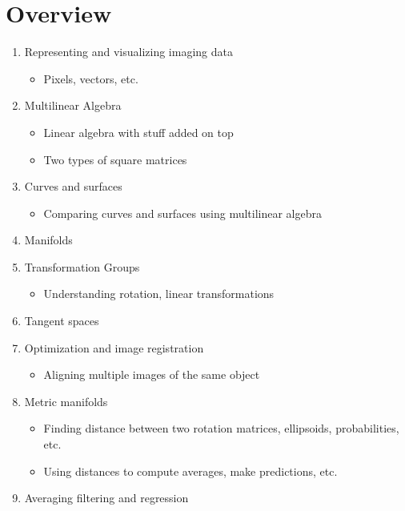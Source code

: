 \documentclass[10pt]{article}
\begin{document}
\section*{Overview}
\begin{enumerate}
    \item Representing and visualizing imaging data
    \begin{itemize}
        \item Pixels, vectors, etc.
    \end{itemize}
    \item Multilinear Algebra
    \begin{itemize}
        \item Linear algebra with stuff added on top
        \item Two types of square matrices
    \end{itemize}
    \item Curves and surfaces
    \begin{itemize}
        \item Comparing curves and surfaces using multilinear algebra
    \end{itemize}
    \item Manifolds
    \item Transformation Groups
    \begin{itemize}
        \item Understanding rotation, linear transformations
    \end{itemize}
    \item Tangent spaces
    \item Optimization and image registration
    \begin{itemize}
        \item Aligning multiple images of the same object
    \end{itemize}
    \item Metric manifolds
    \begin{itemize}
        \item Finding distance between two rotation matrices, ellipsoids, probabilities, etc.
        \item Using distances to compute averages, make predictions, etc.
    \end{itemize}
    \item Averaging filtering and regression
\end{enumerate}
\end{document}
